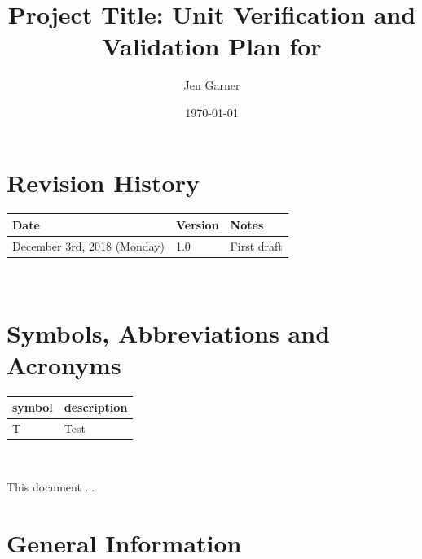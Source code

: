 \documentclass[12pt, titlepage]{article}
\begin{document}
\title{Project Title: Unit Verification and Validation Plan for \progname{}} 
\author{Jen  Garner}
\date{\today}
	
\maketitle


\section{Revision History}

\begin{tabularx}{\textwidth}{p{3cm}p{2cm}X}
\toprule {\bf Date} & {\bf Version} & {\bf Notes}\\
\midrule
December 3rd, 2018 (Monday) & 1.0 & First draft \\
\bottomrule
\end{tabularx}

~\newpage

\tableofcontents

\listoftables


\listoffigures


\newpage

\section{Symbols, Abbreviations and Acronyms}

\renewcommand{\arraystretch}{1.2}
\begin{tabular}{l l} 
  \toprule		
  \textbf{symbol} & \textbf{description}\\
  \midrule 
  T & Test\\
  \bottomrule
\end{tabular}\\


\newpage


This document ... 

\section{General Information}
\end{document}
